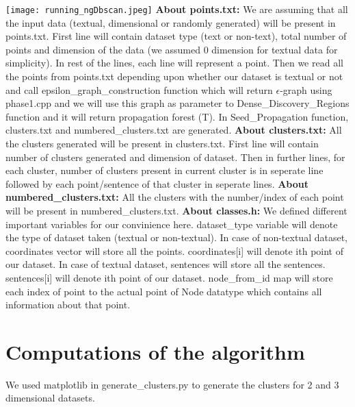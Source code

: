 \documentclass[acmsmall]{acmart}
\begin{document}
\texttt{[image: running\_ngDbscan.jpeg]}
\newline \newline
\textbf{About points.txt: }
We are assuming that all the input data (textual, dimensional or randomly generated) will be present in points.txt. First line will contain dataset type (text or non-text), total number of points and dimension of the data (we assumed 0 dimension for textual data for simplicity). In rest of the lines, each line will represent a point.\newline
Then we read all the points from points.txt depending upon whether our dataset is textual or not and call epsilon\_graph\_construction function which will return $\epsilon$-graph using phase1.cpp and we will use this graph as parameter to Dense\_Discovery\_Regions function and it will return propagation forest (T).
\newline 
In Seed\_Propagation function, clusters.txt and numbered\_clusters.txt are generated. \newline
\textbf{About clusters.txt: } All the clusters generated will be present in clusters.txt. First line will contain number of clusters generated and dimension of dataset. Then in further lines, for each cluster, number of clusters present in current cluster is in seperate line followed by each point/sentence of that cluster in seperate lines.  \newline
\textbf{About numbered\_clusters.txt: } All the clusters with the number/index of each point will be present in numbered\_clusters.txt. 
\newline
\textbf{About classes.h: } We defined different important variables for our convinience here. dataset\_type variable will denote the type of dataset taken (textual or non-textual). In case of non-textual dataset, coordinates vector will store all the points. coordinates[i] will denote ith point of our dataset. In case of textual dataset, sentences will store all the sentences. sentences[i] will denote ith point of our dataset. node\_from\_id map will store each index of point to the actual point of Node datatype which contains all information about that point.

\section*{Computations of the algorithm}
We used matplotlib in generate\_clusters.py to generate the clusters for 2 and 3 dimensional datasets.
\end{document}
